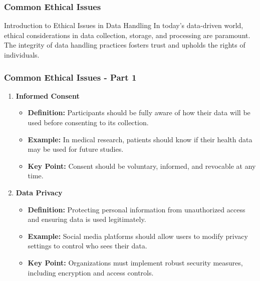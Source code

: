\documentclass[aspectratio=169]{beamer}
\begin{document}
\begin{frame}[fragile]
    \frametitle{Common Ethical Issues}
    \begin{block}{Introduction to Ethical Issues in Data Handling}
        In today's data-driven world, ethical considerations in data collection, storage, and processing are paramount. The integrity of data handling practices fosters trust and upholds the rights of individuals.
    \end{block}
\end{frame}

\begin{frame}[fragile]
    \frametitle{Common Ethical Issues - Part 1}
    \begin{enumerate}
        \item \textbf{Informed Consent}
            \begin{itemize}
                \item \textbf{Definition:} Participants should be fully aware of how their data will be used before consenting to its collection.
                \item \textbf{Example:} In medical research, patients should know if their health data may be used for future studies.
                \item \textbf{Key Point:} Consent should be voluntary, informed, and revocable at any time.
            \end{itemize}
        
        \item \textbf{Data Privacy}
            \begin{itemize}
                \item \textbf{Definition:} Protecting personal information from unauthorized access and ensuring data is used legitimately.
                \item \textbf{Example:} Social media platforms should allow users to modify privacy settings to control who sees their data.
                \item \textbf{Key Point:} Organizations must implement robust security measures, including encryption and access controls.
            \end{itemize}
    \end{enumerate}
\end{frame}
\end{document}
